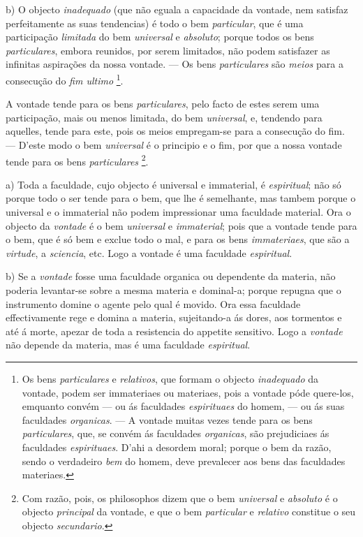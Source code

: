 b) O objecto \emph{inadequado} (que não eguala a capacidade da vontade, nem satisfaz perfeitamente as suas tendencias) é todo o bem \emph{particular}, que é uma participação \emph{limitada} do bem \emph{universal} e \emph{absoluto}; porque todos os bens \emph{particulares}, embora reunidos, por serem limitados, não podem satisfazer as infinitas   aspirações da nossa vontade. --- Os bens \emph{particulares} são \emph{meios} para a consecução do \emph{fim ultimo} \footnote{Os bens \emph{particulares} e \emph{relativos}, que formam o objecto \emph{inadequado} da vontade, podem ser immateriaes ou materiaes, pois a vontade póde quere-los, emquanto convém --- ou ás faculdades \emph{espirituaes} do homem, --- ou ás suas faculdades \emph{organicas}. --- A vontade muitas vezes tende para os bens \emph{particulares}, que, se convém ás faculdades \emph{organicas}, são prejudiciaes ás faculdades \emph{espirituaes}. D'ahi a desordem moral; porque o bem da razão, sendo o verdadeiro \emph{bem} do homem, deve prevalecer aos bens das faculdades materiaes.}.

A vontade tende para os bens \emph{particulares}, pelo facto de estes serem uma participação, mais ou menos limitada, do bem \emph{universal}, e, tendendo para aquelles, tende para este, pois os meios empregam-se para a consecução do fim. --- D'este modo o bem \emph{universal} é o principio e o fim, por que a nossa vontade tende para os bens \emph{particulares} \footnote{Com razão, pois, os philosophos dizem que o bem \emph{universal} e \emph{absoluto} é o objecto \emph{principal} da vontade, e que o bem \emph{particular} e \emph{relativo} constitue o seu objecto \emph{secundario}.}.



a) Toda a faculdade, cujo objecto é universal e immaterial, é \emph{espiritual}; não só porque todo o ser tende para o bem, que lhe é semelhante, mas tambem porque o universal e o immaterial não podem impressionar uma faculdade material. Ora o objecto da \emph{vontade} é o bem \emph{universal} e \emph{immaterial}; pois que a vontade tende para o bem, que é só bem e exclue todo o mal, e para os bens \emph{immateriaes}, que são a \emph{virtude}, a \emph{sciencia}, etc. Logo a vontade é uma faculdade \emph{espiritual}.

b) Se a \emph{vontade} fosse uma faculdade organica ou dependente da materia, não poderia levantar-se sobre a mesma materia e dominal-a; porque repugna que o instrumento domine o agente pelo qual é movido. Ora essa faculdade effectivamente rege e domina a materia, sujeitando-a ás dores, aos tormentos e até á morte, apezar de toda a resistencia do appetite sensitivo. Logo a \emph{vontade} não depende da materia, mas é uma faculdade \emph{espiritual}.


